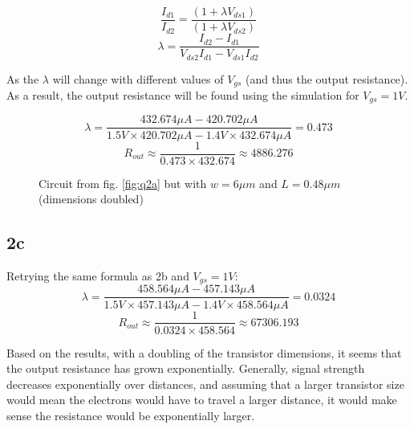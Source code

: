\documentclass[12pt, letterpaper, notitlepage, DIV=16, BCOR=1mm, headlines=2]{scrreprt}
\begin{document}
$$
\frac{I_{d1}}{I_{d2}} = \frac{(1+\lambda V_{ds1})}{(1+\lambda V_{ds2})}
$$
$$
\lambda = \frac{I_{d2}-I_{d1}}{V_{ds2}I_{d1}-V_{ds1}I_{d2}}
$$

As the $\lambda $ will change with different values of $V_{gs}$ (and thus the output resistance).
As a result, the output resistance will be found using the simulation for $V_{gs} = 1V$.

$$
\lambda = \frac{432.674\mu A - 420.702\mu A}{1.5V \times 420.702\mu A - 1.4V \times 432.674\mu A}
= 0.473
$$
$$
R_{out} \approx \frac{1}{0.473 \times 432.674} \approx 4886.276
$$

\pagebreak
\begin{figure}[!ht]
	\caption{Circuit from fig. \ref{fig:q2a} 
  but with $w = 6\mu m$ and $L = 0.48\mu m$ (dimensions doubled)}
	\label{fig:q2c}
\end{figure}
\subsection*{2c}

Retrying the same formula as 2b and $V_{gs} = 1V$:
$$
\lambda = \frac{458.564\mu A - 457.143\mu A}{1.5V \times 457.143\mu A - 1.4V \times 458.564\mu A}
= 0.0324
$$
$$
R_{out} \approx \frac{1}{0.0324 \times 458.564} \approx 67306.193
$$

Based on the results, with a doubling of the transistor dimensions, it seems that the output
resistance has grown exponentially. Generally, signal strength decreases exponentially over distances,
and assuming that a larger transistor size would mean the electrons would have to travel a larger distance,
it would make sense the resistance would be exponentially larger.
\end{document}
